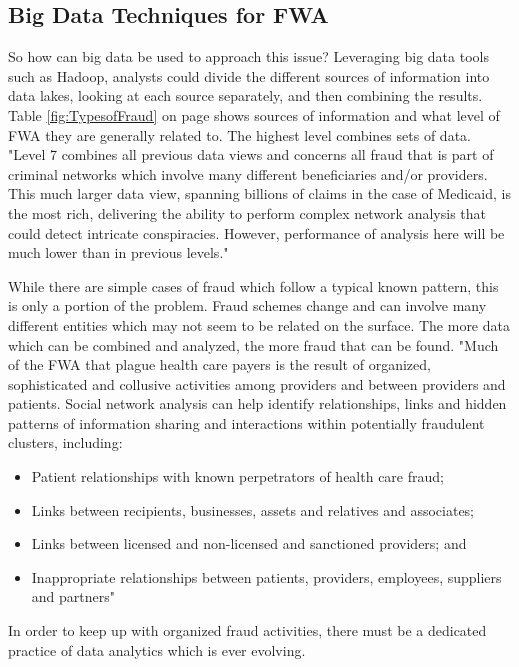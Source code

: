 \documentclass[sigconf]{acmart}
\begin{document}
\subsection{Big Data Techniques for FWA}

So how can big data be used to approach this issue?  Leveraging big data tools such as 
Hadoop, analysts could divide the different sources of information into data lakes, 
looking at each source separately, and then combining the results.  Table 
\ref{fig:TypesofFraud} on page \pageref{fig:TypesofFraud} shows sources of information 
and what level of FWA they are generally related to.  The highest level combines sets 
of data.  "Level 7 combines all previous data views and concerns all fraud that is part 
of criminal networks which involve many different beneficiaries and/or providers. This 
much larger data view, spanning billions of claims in the case of Medicaid, is the most 
rich, delivering the ability to perform complex network analysis that could detect 
intricate conspiracies. However, performance of analysis here will be much lower than 
in previous levels."\cite{THORNTON20131252} 

While there are simple cases of fraud which follow 
a typical known pattern, this is only a portion of the problem.  Fraud schemes 
change and can involve many different entities which may not seem to be related on the 
surface.  The more data which can be combined and analyzed, the more fraud that can be 
found.  "Much of the FWA that plague health care payers is the result of organized, 
sophisticated and collusive activities among providers and between providers and patients. 
Social network analysis can help identify relationships, links and hidden patterns of 
information sharing and interactions within potentially fraudulent clusters, including:
\begin{itemize}
  \item Patient relationships with known perpetrators of health care fraud;
  \item Links between recipients, businesses, assets and relatives and associates;
  \item Links between licensed and non-licensed and sanctioned providers; and
  \item Inappropriate relationships between patients, providers, employees, suppliers 
  and partners"\cite{LexisNexis}
\end{itemize}
In order to keep up with organized fraud activities, there must be a dedicated practice 
of data analytics which is ever evolving. 
\end{document}
